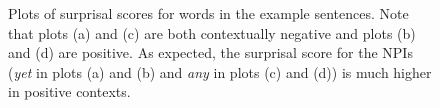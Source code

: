\documentclass[11pt]{article}
\begin{document}
\begin{figure}
    \centering
    \qquad
    \caption{Plots of surprisal scores for words in the example sentences. Note that plots (a) and (c) are both contextually negative and plots (b) and (d) are positive. As expected, the surprisal score for the NPIs (\textit{yet} in plots (a) and (b) and \textit{any} in plots (c) and (d)) is much higher in positive contexts.}
    \label{fig:example}
\end{figure}
\end{document}
